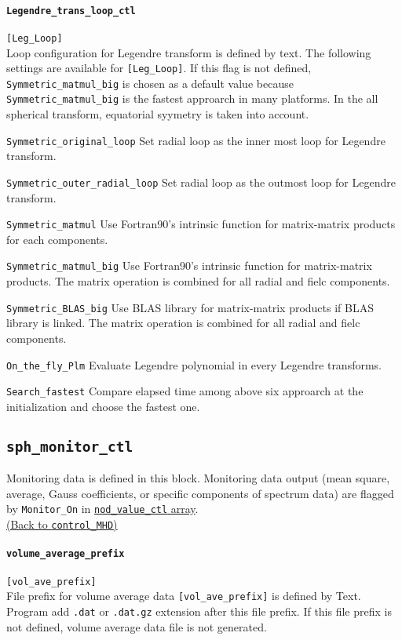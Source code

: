 \paragraph{\tt Legendre\_trans\_loop\_ctl}
\label{href_t:Legendre_trans_loop_ctl}
\verb|[Leg_Loop]| \\
Loop configuration for Legendre transform is defined by text. The following settings are available for \verb|[Leg_Loop]|. 
If this flag is not defined, \verb|Symmetric_matmul_big| is chosen as a default value because \verb|Symmetric_matmul_big| is the fastest approarch in many platforms. In the all spherical transform, equatorial syymetry is taken into account.
%
\begin{description}
\item{\tt Symmetric_original_loop}	Set radial loop as the inner most loop for Legendre transform.
\item{\tt Symmetric_outer_radial_loop}	Set radial loop as the outmost loop for Legendre transform.
\item{\tt Symmetric_matmul}    Use Fortran90's intrinsic function for matrix-matrix products for each components.
\item{\tt Symmetric_matmul_big}   Use Fortran90's intrinsic function for matrix-matrix products. The matrix operation is combined for all radial and fielc components.
\item{\tt Symmetric_BLAS_big}    Use BLAS library for matrix-matrix products if BLAS library is linked. The matrix operation is combined for all radial and fielc components.
\item{\tt On_the_fly_Plm}   Evaluate Legendre polynomial in every Legendre transforms.
\item{\tt Search_fastest}	Compare elapsed time among above six approarch at the initialization and choose the fastest one.
\end{description}
%

%
\subsection{\tt sph\_monitor\_ctl}
\label{href_t:sph_monitor_ctl}
Monitoring data is defined in this block. Monitoring data output (mean square, average, Gauss coefficients, or specific components of spectrum data) are flagged by {\tt Monitor\_On} in \hyperref[href_t:nod_value_ctl]{ {\tt nod\_value\_ctl} array}. \\
\hyperref[href_i:sph_monitor_ctl]{(Back to {\tt control\_MHD})}

\paragraph{\tt volume\_average\_prefix}
\label{href_t:volume_average_prefix}
\verb|[vol_ave_prefix]| \\
File prefix for volume average data \verb|[vol_ave_prefix]| is defined by Text. Program add {\tt .dat} or {\tt .dat.gz} extension after this file prefix. If this file prefix is not defined, volume average data file is not generated. 

